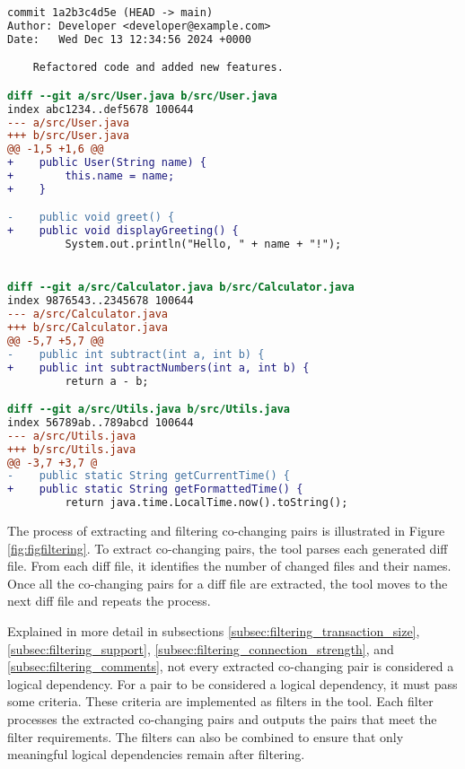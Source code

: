 \begin{lstlisting}[language=diff, caption={Example output of \texttt{git diff} between two commits.}, label={lst:git_diff}]
commit 1a2b3c4d5e (HEAD -> main)
Author: Developer <developer@example.com>
Date:   Wed Dec 13 12:34:56 2024 +0000

    Refactored code and added new features.

diff --git a/src/User.java b/src/User.java
index abc1234..def5678 100644
--- a/src/User.java
+++ b/src/User.java
@@ -1,5 +1,6 @@
+    public User(String name) {
+        this.name = name;
+    }

-    public void greet() {
+    public void displayGreeting() {
         System.out.println("Hello, " + name + "!");


diff --git a/src/Calculator.java b/src/Calculator.java
index 9876543..2345678 100644
--- a/src/Calculator.java
+++ b/src/Calculator.java
@@ -5,7 +5,7 @@ 
-    public int subtract(int a, int b) {
+    public int subtractNumbers(int a, int b) {
         return a - b;

diff --git a/src/Utils.java b/src/Utils.java
index 56789ab..789abcd 100644
--- a/src/Utils.java
+++ b/src/Utils.java
@@ -3,7 +3,7 @
-    public static String getCurrentTime() {
+    public static String getFormattedTime() {
         return java.time.LocalTime.now().toString();

\end{lstlisting}


The process of extracting and filtering co-changing pairs is illustrated in Figure \ref{fig:figfiltering}. To extract co-changing pairs, the tool parses each generated diff file. From each diff file, it identifies the number of changed files and their names. Once all the co-changing pairs for a diff file are extracted, the tool moves to the next diff file and repeats the process.

Explained in more detail in subsections \ref{subsec:filtering_transaction_size}, \ref{subsec:filtering_support}, \ref{subsec:filtering_connection_strength}, and \ref{subsec:filtering_comments}, not every extracted co-changing pair is considered a logical dependency. For a pair to be considered a logical dependency, it must pass some criteria. These criteria are implemented as filters in the tool. Each filter processes the extracted co-changing pairs and outputs the pairs that meet the filter requirements. The filters can also be combined to ensure that only meaningful logical dependencies remain after filtering.

